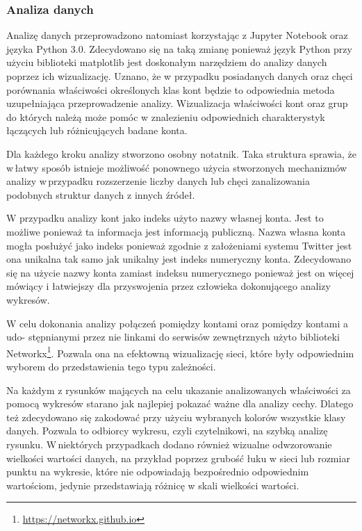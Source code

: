 \subsubsection{Analiza danych}
Analizę danych przeprowadzono natomiast korzystając z Jupyter Notebook oraz języka Python 3.0. Zdecydowano się na taką zmianę ponieważ język Python przy użyciu biblioteki matplotlib jest doskonałym narzędziem do analizy danych poprzez ich wizualizację. Uznano, że w przypadku posiadanych danych oraz chęci porównania właściwości określonych klas kont będzie to odpowiednia metoda uzupełniająca przeprowadzenie analizy. Wizualizacja właściwości kont oraz grup do których należą może pomóc w znalezieniu odpowiednich charakterystyk łączących lub różnicujących badane konta. 
\par
Dla każdego kroku analizy stworzono osobny notatnik. Taka struktura sprawia, że w\,łatwy sposób istnieje możliwość ponownego użycia stworzonych mechanizmów analizy w\,przypadku rozszerzenie liczby danych lub chęci zanalizowania podobnych struktur danych z innych źródeł. 
\par
W przypadku analizy kont jako indeks użyto nazwy własnej konta. Jest to możliwe ponieważ ta informacja jest informacją publiczną. Nazwa własna konta mogła posłużyć jako indeks ponieważ zgodnie z założeniami systemu Twitter jest ona unikalna tak samo jak unikalny jest indeks numeryczny konta. Zdecydowano się na użycie nazwy konta zamiast indeksu numerycznego ponieważ jest on więcej mówiący i łatwiejszy dla przyswojenia przez człowieka dokonującego analizy wykresów. 
\par
W celu dokonania analizy połączeń pomiędzy kontami oraz pomiędzy kontami a\,udo- stępnianymi przez nie linkami do serwisów zewnętrznych użyto biblioteki Networkx\footnote{\url{https://networkx.github.io}}. Pozwala ona na efektowną wizualizację sieci, które były odpowiednim wyborem do przedstawienia tego typu zależności. 
\par
Na każdym z rysunków mających na celu ukazanie analizowanych właściwości za pomocą wykresów starano jak najlepiej pokazać ważne dla analizy cechy. Dlatego też zdecydowano się zakodować przy użyciu wybranych kolorów wszystkie klasy danych. Pozwala to odbiorcy wykresu, czyli czytelnikowi, na szybką analizę rysunku. W\,niektórych przypadkach dodano również wizualne odwzorowanie wielkości wartości danych, na przykład poprzez grubość łuku w sieci lub rozmiar punktu na wykresie, które nie odpowiadają bezpośrednio odpowiednim wartościom, jedynie przedstawiają różnicę w skali wielkości wartości. 

